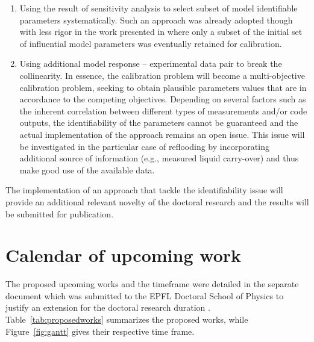 \documentclass[11pt,titlepage]{article}
\begin{document}
\begin{enumerate}
    \item Using the result of sensitivity analysis to select subset of model 
    identifiable parameters systematically. 
    Such an approach was already adopted though with less rigor in the 
    work presented in \cite{Wicaksono2016} where only a subset of the 
    initial set of influential model parameters was eventually retained 
    for calibration.
    \item Using additional model response – experimental data pair to break the 
    collinearity. 
    In essence, the calibration problem will become a 
    multi-objective calibration problem, seeking to obtain plausible parameters 
    values that are in accordance to the competing objectives. 
    Depending on several factors such as the inherent correlation between 
    different types of measurements and/or code outputs, the identifiability 
    of the parameters cannot be guaranteed and the actual implementation of the 
    approach remains an open issue. This issue will be investigated in the 
    particular case of reflooding by incorporating additional source of 
    information (e.g., measured liquid carry-over) and thus make good use of 
    the available data.    
\end{enumerate}

The implementation of an approach that tackle the identifiability issue will 
provide an additional relevant novelty of the doctoral research and the 
results will be submitted for publication. 


\section{Calendar of upcoming work}

The proposed upcoming works and the timeframe were detailed in the separate 
document which was submitted to the EPFL Doctoral School of Physics to 
justify an extension for the doctoral research duration \cite{Wicaksono2016d}.
Table~\ref{tab:proposedworks} summarizes the proposed works, while Figure~\ref{fig:gantt} gives their respective time frame.
\end{document}
